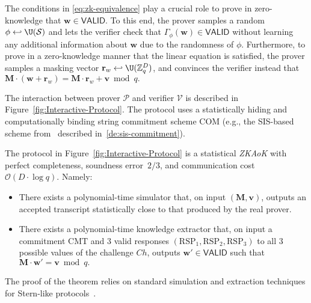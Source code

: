 The conditions in \eqref{eq:zk-equivalence} play a crucial role to prove in zero-knowledge that $\mathbf{w} \in \mathsf{VALID}$. To this end, the prover samples a random $\phi \hookleftarrow \U(\mathcal{S})$ and lets the verifier check that $\Gamma_\phi(\mathbf{w}) \in \mathsf{VALID}$ without learning any additional information about $\mathbf{w}$ due to the randomness of $\phi$. Furthermore, to prove in a zero-knowledge manner that the linear equation is satisfied, the prover samples a masking vector $\mathbf{r}_w \hookleftarrow \U(\mathbb{Z}_q^D)$, and convinces the verifier instead that $\mathbf{M}\cdot (\mathbf{w} + \mathbf{r}_w) = \mathbf{M}\cdot \mathbf{r}_w + \mathbf{v} \bmod q.$


The interaction between prover $\mathcal{P}$ and verifier $\mathcal{V}$ is described in Figure~\ref{fig:Interactive-Protocol}. The protocol uses a statistically hiding and computationally binding string commitment scheme \textsf{COM} (e.g., the \textsf{SIS}-based scheme from~\cite{KTX08} described in~\cref{de:sis-commitment}).

\begin{theorem}\label{Theorem:zk-protocol}
The protocol in Figure~\ref{fig:Interactive-Protocol} is a statistical \emph{\textsf{ZKAoK}} with perfect completeness, soundness error~$2/3$, and communication cost~$\mathcal{O}(D \cdot \log q)$. Namely:
\begin{itemize}
\item There exists a polynomial-time simulator that, on input $(\mathbf{M}, \mathbf{v})$, outputs an accepted transcript statistically close to that produced by the real prover.
\item There exists a polynomial-time knowledge extractor that, on input a commitment $\mathrm{CMT}$ and $3$ valid responses $(\mathrm{RSP}_1,\mathrm{RSP}_2,\mathrm{RSP}_3)$ to all $3$ possible values of the challenge $Ch$, outputs $\mathbf{w}' \in \mathsf{VALID}$ such that $\mathbf{M}\cdot \mathbf{w}' = \mathbf{v} \bmod q.$
\end{itemize}
\end{theorem}
The proof of the theorem relies on standard simulation and extraction techniques for Stern-like protocols~\cite{KTX08,LNSW13,LLM+16}.

